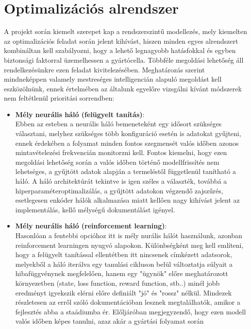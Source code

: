 \documentclass{article}
\begin{document}
\section{Optimalizációs alrendszer}
A projekt során kiemelt szerepet kap a rendszerszintű modellezés, mely kiemelten az
 optimalizációs feladat során jelent kihívást, hiszen minden egyes alrendszert kombináltan 
  kell szabályozni, hogy a lehető legnagyobb hatásfokkal és egyben biztonsági faktorral
 üzemelhessen a gyártócella. Többféle megoldási lehetőség áll rendelkezésünkre ezen feladat
 kivitelezésében. Meghatározás szerint mindneképpen valamely mestreséges intelligencián alapuló
 megoldást kell eszközölnünk, ennek értelmében az általunk egyelőre vizsgálni kívánt 
 módszerek nem feltétlenül prioritási sorrendben:
 \begin{itemize}
    \item \textbf{Mély neurális háló (felügyelt tanítás)}:\\
    Ebben az esteben a neurális háló bemeneteként egy idősort szükséges választani,
     melyhez szükséges több konfiguráció esetén is adatokat gyűjteni, ennek érdekében
     a folyamat minden fontos szegmensét valós időben azonos mintavételezési frekvencián
     monitorzni kell. Fontos kiemelni, hogy ezen megoldási lehetőség során a valós időben
     történő modellfrissítés nem lehetséges, a gyűjtött adatok alapján a termeléstől
     függetlenül tanítható a háló. A háló architektúrát tekintve is igen széles a választék,
     továbbá a hiperparaméteroptimalizálás, a gyűjtött adatokon végzendő zajszűrés, esetlegesen
     enkóder hálók alkalmazása miatt kellően nagy kihívást jelent az implementálás,
     kellő mélységű dokumentálást igényel.
    \item \textbf{Mély neurális háló (reinforcement learning)}:\\
     Hasonlóan a fentebbi opcióhoz itt is mély nurális hálót használunk, azonban reinforcement 
     learningen nyugvó alapokon. Különbségként meg kell említeni, hogy a felügyelt tanítással ellentétben
     itt nincsenek címkézett adatsorok, melyekből a háló iterálva egy tanulási cikluson belül
     változtatja súlyait a hibafüggvénynek megfelelően, hanem egy "ügynök" előre meghatározott
     környezetben (state, loss function, reward function, stb..) minél jobb eredményt igyekszik elérni
     előre definiált "jó" és "rossz" nélkül. Mindezek részletesen az erről szóló dokumentációban lesznek megtalálhatók, amikor a fejlesztés abba a staádiumba ér. 
     Előljáróban megjegyzendő, hogy ezen modell valós időben képes tanulni, azaz akár a gyártási folyamat során

\end{itemize}
\end{document}
